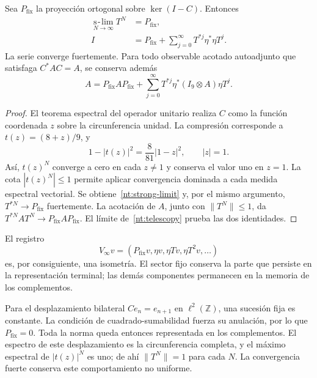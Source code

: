 \begin{theorem}
Sea \(P_{\mathrm{fix}}\) la proyección ortogonal sobre
\(\ker(I-C)\). Entonces
\begin{align}
 \operatorname*{s\!-\!lim}_{N\to\infty}T^N
   &=P_{\mathrm{fix}},\label{nt:strong-limit}\\
 I&=P_{\mathrm{fix}}+
 \sum_{j=0}^{\infty}T^{*j}\eta^*\eta T^j.\label{nt:infinite-record}
\end{align}
La serie converge fuertemente. Para todo observable acotado
autoadjunto que satisfaga \(C^*AC=A\), se conserva además
\begin{equation}
 A=P_{\mathrm{fix}}AP_{\mathrm{fix}}+
 \sum_{j=0}^{\infty}
 T^{*j}\eta^*(I_9\otimes A)\eta T^j.
 \label{nt:infinite-observable}
\end{equation}
\end{theorem}

\begin{proof}
El teorema espectral del operador unitario realiza \(C\) como
la función coordenada \(z\) sobre la circunferencia unidad.
La compresión corresponde a \(t(z)=(8+z)/9\), y
\begin{equation}
 1-|t(z)|^2=\frac8{81}|1-z|^2,
 \qquad |z|=1.
 \label{nt:circular-defect}
\end{equation}
Así, \(t(z)^N\) converge a cero en cada \(z\ne1\) y conserva
el valor uno en \(z=1\). La cota \(|t(z)^N|\leq1\) permite
aplicar convergencia dominada a cada medida espectral vectorial.
Se obtiene~\eqref{nt:strong-limit} y, por el mismo argumento,
\(T^{*N}\to P_{\mathrm{fix}}\) fuertemente. La acotación de
\(A\), junto con \(\|T^N\|\leq1\), da
\(T^{*N}AT^N\to P_{\mathrm{fix}}AP_{\mathrm{fix}}\).
El límite de~\eqref{nt:telescopy} prueba las dos identidades.
\end{proof}

El registro
\[
 V_\infty v=(P_{\mathrm{fix}}v,\eta v,\eta Tv,\eta T^2v,\ldots)
\]
es, por consiguiente, una isometría. El sector fijo conserva la
parte que persiste en la representación terminal; las demás
componentes permanecen en la memoria de los complementos.

Para el desplazamiento bilateral
\(C e_n=e_{n+1}\) en \(\ell^2(\mathbb Z)\), una sucesión fija
es constante. La condición de cuadrado-sumabilidad fuerza su
anulación, por lo que \(P_{\mathrm{fix}}=0\). Toda la norma
queda entonces representada en los complementos. El espectro de
este desplazamiento es la circunferencia completa, y el máximo
espectral de \(|t(z)|^N\) es uno; de ahí
\(\|T^N\|=1\) para cada \(N\). La convergencia fuerte conserva
este comportamiento no uniforme.

